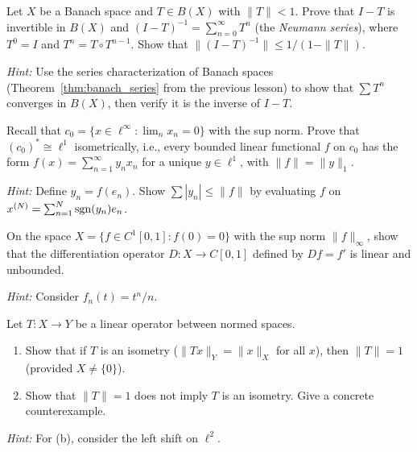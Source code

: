 \documentclass[11pt,a4paper]{article}
\begin{document}
\begin{exercise}
\label{ex:neumann}
Let $X$ be a Banach space and $T \in B(X)$ with $\|T\| < 1$. Prove that
$I - T$ is invertible in $B(X)$ and $(I - T)^{-1} = \sum_{n=0}^\infty T^n$
(the \emph{Neumann series}), where $T^0 = I$ and $T^n = T \circ T^{n-1}$.
Show that $\|(I-T)^{-1}\| \le 1/(1 - \|T\|)$.

\emph{Hint:} Use the series characterization of Banach spaces
(Theorem~\ref{thm:banach_series} from the previous lesson) to show that
$\sum T^n$ converges in $B(X)$, then verify it is the inverse of $I - T$.
\end{exercise}

\begin{exercise}[Dual of $c_0$]
\label{ex:dual_c0}
Recall that $c_0 = \{x \in \ell^\infty : \lim_n x_n = 0\}$ with the sup
norm. Prove that $(c_0)^* \cong \ell^1$ isometrically, i.e., every bounded
linear functional $f$ on $c_0$ has the form $f(x) = \sum_{n=1}^\infty y_n x_n$
for a unique $y \in \ell^1$, with $\|f\| = \|y\|_1$.

\emph{Hint:} Define $y_n = f(e_n)$. Show $\sum |y_n| \le \|f\|$ by
evaluating $f$ on $x^{(N)} = \sum_{n=1}^N \operatorname{sgn}(y_n) e_n$.
\end{exercise}

\begin{exercise}
\label{ex:unbounded_complete}
On the space $X = \{f \in C^1[0,1] : f(0) = 0\}$ with the sup norm
$\|f\|_\infty$, show that the differentiation operator $D \colon X \to C[0,1]$
defined by $Df = f'$ is linear and unbounded.

\emph{Hint:} Consider $f_n(t) = t^n / n$.
\end{exercise}

\begin{exercise}
\label{ex:isometry}
Let $T \colon X \to Y$ be a linear operator between normed spaces.
\begin{enumerate}[nosep,label=(\alph*)]
  \item Show that if $T$ is an isometry ($\|Tx\|_Y = \|x\|_X$ for all $x$),
    then $\|T\| = 1$ (provided $X \ne \{0\}$).
  \item Show that $\|T\| = 1$ does not imply $T$ is an isometry. Give a
    concrete counterexample.
\end{enumerate}

\emph{Hint:} For (b), consider the left shift on $\ell^2$.
\end{exercise}


\end{document}
